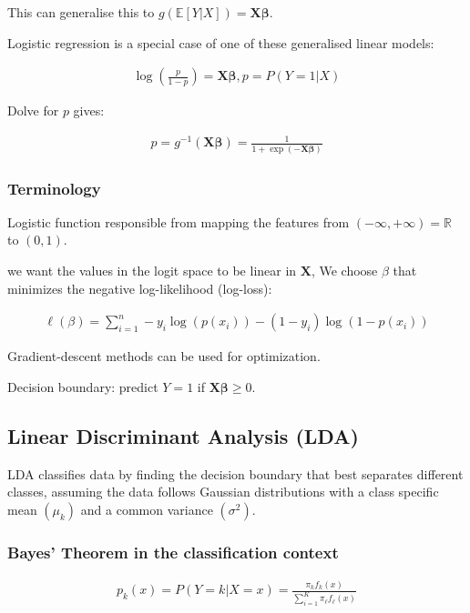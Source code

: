 This can generalise this to $g(\mathbb{E}[Y|X]) = \boldsymbol{X\beta}$.

Logistic regression is a special case of one of these generalised linear models:

\begin{align*}
    \log(\frac{p}{1-p}) = \boldsymbol{X\beta}, p = P(Y=1|X)
\end{align*}

Dolve for $p$ gives:

\begin{align*}
    p = g^{-1}(\boldsymbol{X\beta}) = \frac{1}{1+\exp{(-\boldsymbol{X\beta})}}
\end{align*}

\subsubsection{Terminology}

Logistic function responsible from mapping the features from $(-\infty,+\infty) = \mathbb{R}$ to $(0,1)$.

we want the values in the logit space to be linear in $\boldsymbol{X}$, We choose 
$\beta$ that minimizes the negative log-likelihood (log-loss):

\begin{align*}
    \ell(\beta) = \sum_{i=1}^n -y_i\log(p(x_i)) - (1-y_i)\log(1-p(x_i))
\end{align*}

Gradient-descent methods can be used for optimization.

Decision boundary: predict $Y=1$ if $\boldsymbol{X\beta}\geq 0$.

\subsection{Linear Discriminant Analysis (LDA)}

\indent 

LDA classifies data by finding the decision boundary that best separates different classes, assuming the data follows Gaussian distributions with a class specific mean $(\mu_k)$ and a common variance $(\sigma^2)$.

\subsubsection{Bayes’ Theorem in the classification context}

\begin{align*}
    p_k(x) = P(Y=k|X=x) = \frac{\pi_kf_k(x)}{\sum_{i=1}^K\pi_\ell f_\ell (x)}
\end{align*}

